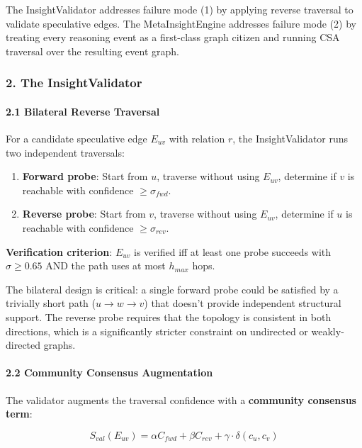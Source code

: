The InsightValidator addresses failure mode (1) by applying reverse traversal to validate speculative edges. The MetaInsightEngine addresses failure mode (2) by treating every reasoning event as a first-class graph citizen and running CSA traversal over the resulting event graph.

\subsubsection{2. The InsightValidator}

\paragraph{2.1 Bilateral Reverse Traversal}
For a candidate speculative edge $E_{uv}$ with relation $r$, the InsightValidator runs two independent traversals:

\begin{enumerate}
\item \textbf{Forward probe}: Start from $u$, traverse without using $E_{uv}$, determine if $v$ is reachable with confidence $\geq \sigma_{fwd}$.
\item \textbf{Reverse probe}: Start from $v$, traverse without using $E_{uv}$, determine if $u$ is reachable with confidence $\geq \sigma_{rev}$.

\end{enumerate}
\textbf{Verifi\-cation criterion}: $E_{uv}$ is verified iff at least one probe succeeds with $\sigma \geq 0.65$ AND the path uses at most $h_{max}$ hops.

The bilateral design is critical: a single forward probe could be satisfied by a trivially short path ($u \to w \to v$) that doesn't provide independent structural support. The reverse probe requires that the topology is consistent in both directions, which is a signi\-ficantly stricter constraint on undirected or weakly-directed graphs.

\paragraph{2.2 Community Consensus Augmen\-tation}
The validator augments the traversal confidence with a \textbf{community consensus term}:

\begin{equation}
S_{val}(E_{uv}) = \alpha C_{fwd} + \beta C_{rev} + \gamma \cdot \delta(c_u, c_v)
\end{equation}

